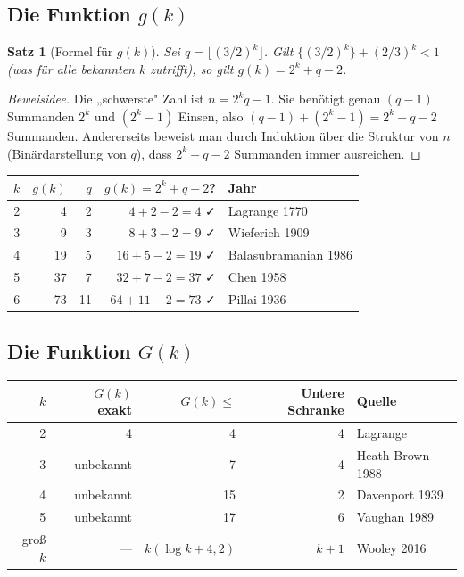 \documentclass[12pt,a4paper]{amsart}
\newtheorem{theorem}{Satz}[section]
\theoremstyle{definition}
\begin{document}
\subsection{Die Funktion $g(k)$}

\begin{theorem}[Formel für $g(k)$]\label{thm:gk_formel}
  Sei $q = \lfloor (3/2)^k \rfloor$.  Gilt
  $\{(3/2)^k\} + (2/3)^k < 1$ (was für alle bekannten $k$ zutrifft),
  so gilt $g(k) = 2^k + q - 2$.
\end{theorem}

\begin{proof}[Beweisidee]
  Die „schwerste" Zahl ist $n = 2^k q - 1$.  Sie benötigt genau $(q-1)$
  Summanden $2^k$ und $(2^k - 1)$ Einsen, also $(q-1)+(2^k-1) = 2^k+q-2$
  Summanden.  Andererseits beweist man durch Induktion über die Struktur
  von $n$ (Binärdarstellung von $q$), dass $2^k+q-2$ Summanden immer
  ausreichen.
\end{proof}

\begin{center}
\begin{tabular}{rrrrl}
\toprule
$k$ & $g(k)$ & $q$ & $g(k) = 2^k+q-2$? & Jahr \\
\midrule
2 & 4 & 2 & $4+2-2=4$ ✓ & Lagrange 1770 \\
3 & 9 & 3 & $8+3-2=9$ ✓ & Wieferich 1909 \\
4 & 19 & 5 & $16+5-2=19$ ✓ & Balasubramanian 1986 \\
5 & 37 & 7 & $32+7-2=37$ ✓ & Chen 1958 \\
6 & 73 & 11 & $64+11-2=73$ ✓ & Pillai 1936 \\
\bottomrule
\end{tabular}
\end{center}

\subsection{Die Funktion $G(k)$}

\begin{center}
\begin{tabular}{rrrrl}
\toprule
$k$ & $G(k)$ exakt & $G(k) \leq$ & Untere Schranke & Quelle \\
\midrule
2 & 4 & 4 & 4 & Lagrange \\
3 & unbekannt & 7 & 4 & Heath-Brown 1988 \\
4 & unbekannt & 15 & 2 & Davenport 1939 \\
5 & unbekannt & 17 & 6 & Vaughan 1989 \\
groß $k$ & — & $k(\log k+4{,}2)$ & $k+1$ & Wooley 2016 \\
\bottomrule
\end{tabular}
\end{center}
\end{document}
